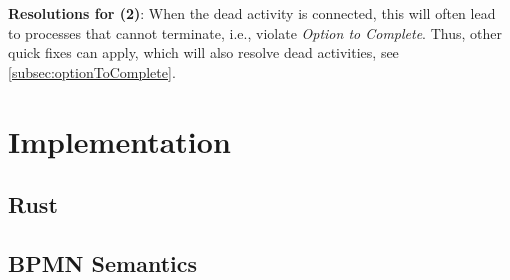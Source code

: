 \documentclass[runningheads]{llncs}
\begin{document}
\textbf{Resolutions for (2)}: When the dead activity is connected, this will often lead to processes that cannot terminate, i.e., violate \textit{Option to Complete}.
Thus, other quick fixes can apply, which will also resolve dead activities, see \autoref{subsec:optionToComplete}.

\section{Implementation}


\subsection{Rust}



\subsection{BPMN Semantics}
\end{document}

